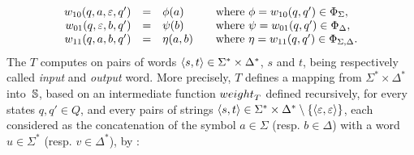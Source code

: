 \[
\begin{array}{rcll}
\wei_{10}(q, a, \varepsilon, q') & = & \phi(a) & %
\quad\mathrm{where~} \phi = \wei_{10}(q, q') \in \Phi_\Sigma,\\
\wei_{01}(q, \varepsilon, b, q') & = & \psi(b) & 
\quad\mathrm{where~} \psi = \wei_{01}(q, q') \in \Phi_\Delta,\\
\wei_{11}(q, a, b, q') & = & \eta(a, b) & 
\quad\mathrm{where~} \eta = \wei_{11}(q, q') \in \Phi_{\Sigma, \Delta}.\\
\end{array}      
\]
%
\noindent 
The \SWT $T$ computes on pairs of words $\< s, t> \in \Sigma^* \times \Delta^*$,
$s$ and $t$, being respectively called \emph{input} and \emph{output} word.
More precisely, $T$ defines a mapping 
from $\Sigma^* \times \Delta^*$ into~$\mathbb{S}$,
based on an intermediate function $\weight_T$
defined recursively, for every states $q, q' \in Q$, 
and every pairs of strings $\< s, t> \in \Sigma^* \times \Delta^* \setminus \{ \< \varepsilon, \varepsilon >\}$,
each  considered as the concatenation
of the symbol $a \in \Sigma$ (resp. $b \in \Delta$) with a word $u \in \Sigma^*$ (resp. $v \in \Delta^*$), by :

